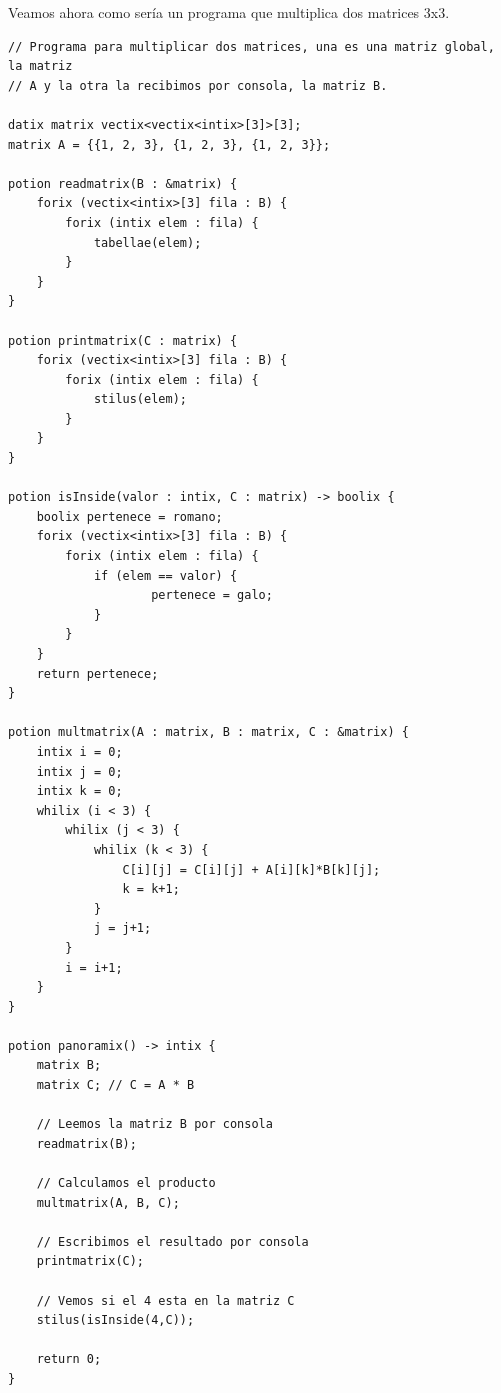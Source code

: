 \documentclass[a4paper, 10pt]{article}
\begin{document}
    Veamos ahora como sería un programa que multiplica dos matrices 3x3.
    \begin{verbatim}
// Programa para multiplicar dos matrices, una es una matriz global, la matriz
// A y la otra la recibimos por consola, la matriz B.

datix matrix vectix<vectix<intix>[3]>[3];
matrix A = {{1, 2, 3}, {1, 2, 3}, {1, 2, 3}};

potion readmatrix(B : &matrix) {
    forix (vectix<intix>[3] fila : B) {
        forix (intix elem : fila) {
            tabellae(elem);
        }
    }
}

potion printmatrix(C : matrix) {
    forix (vectix<intix>[3] fila : B) {
        forix (intix elem : fila) {
            stilus(elem);
        }
    }
}

potion isInside(valor : intix, C : matrix) -> boolix {
    boolix pertenece = romano; 
    forix (vectix<intix>[3] fila : B) {
        forix (intix elem : fila) {
            if (elem == valor) {
                    pertenece = galo;
            }
        }
    }
    return pertenece;
}

potion multmatrix(A : matrix, B : matrix, C : &matrix) {
    intix i = 0;
    intix j = 0;
    intix k = 0;
    whilix (i < 3) {
        whilix (j < 3) {
            whilix (k < 3) {
                C[i][j] = C[i][j] + A[i][k]*B[k][j];
                k = k+1;
            }
            j = j+1;
        }
        i = i+1;
    }
}

potion panoramix() -> intix {
    matrix B;
    matrix C; // C = A * B
    
    // Leemos la matriz B por consola
    readmatrix(B);
    
    // Calculamos el producto
    multmatrix(A, B, C);

    // Escribimos el resultado por consola
    printmatrix(C);

    // Vemos si el 4 esta en la matriz C
    stilus(isInside(4,C));
    
    return 0;
}
    \end{verbatim}
\end{document}
